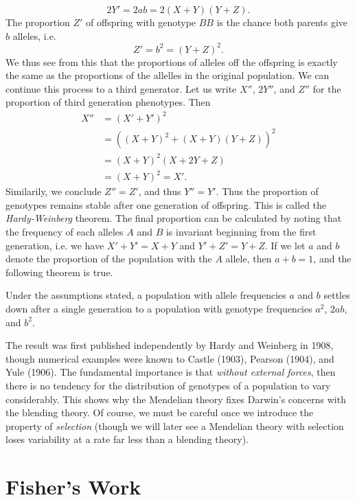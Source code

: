 \[ 2Y' = 2ab = 2 (X + Y) (Y + Z). \]
%
The proportion $Z'$ of offspring with genotype $BB$ is the chance both parents give $b$ alleles, i.e.
%
\[ Z' = b^2 = (Y + Z)^2. \]
%
We thus see from this that the proportions of alleles off the offspring is exactly the same as the proportions of the allelles in the original population. We can continue this process to a third generator. Let us write $X''$, $2Y''$, and $Z''$ for the proportion of third generation phenotypes. Then
%
\begin{align*}
    X'' &= (X' + Y')^2\\
    &= ( (X + Y)^2 + (X + Y)(Y + Z) )^2\\
    &= (X + Y)^2 ( X + 2Y + Z )\\
    &= (X + Y)^2 = X'.
\end{align*}
%
Similarily, we conclude $Z'' = Z'$, and thus $Y'' = Y'$. Thus the proportion of genotypes remains stable after one generation of offspring. This is called the \emph{Hardy-Weinberg} theorem. The final proportion can be calculated by noting that the frequency of each alleles $A$ and $B$ is invariant beginning from the first generation, i.e. we have $X' + Y' = X + Y$ and $Y' + Z' = Y + Z$. If we let $a$ and $b$ denote the proportion of the population with the $A$ allele, then $a + b = 1$, and the following theorem is true.

\begin{theorem}
    Under the assumptions stated, a population with allele frequencies $a$ and $b$ settles down after a single generation to a population with genotype frequencies $a^2$, $2ab$, and $b^2$.
\end{theorem}

The result was first published independently by Hardy and Weinberg in 1908, though numerical examples were known to Castle (1903), Pearson (1904), and Yule (1906). The fundamental importance is that \emph{without external forces}, then there is no tendency for the distribution of genotypes of a population to vary considerably. This shows why the Mendelian theory fixes Darwin's concerns with the blending theory. Of course, we must be careful once we introduce the property of \emph{selection} (though we will later see a Mendelian theory with selection loses variability at a rate far less than a blending theory).

\section{Fisher's Work}

